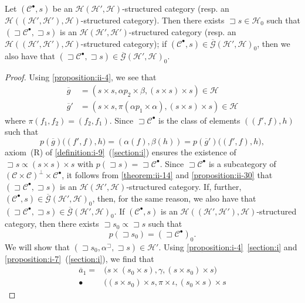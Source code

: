 \documentclass[a4paper,fleqn]{article}
\theoremstyle{plain}
\newenvironment{theorem}[1]
  {\renewcommand\theinnertheorem{#1}\innertheorem}
  {\endinnertheorem}
\theoremstyle{definition}
\newcommand{\oldpage}[1]{{\marginpar{\footnotesize$\bigg\vert$\,\,\,\,\textit{p.~#1}}}}
\newcommand{\CC}{\mathcal{C}}
\newcommand{\HH}{\mathcal{H}}
\newcommand{\subs}{\mathrel{\propto}}
\newcommand{\GG}{\mathcal{G}}
\DeclareMathOperator{\trio}{\sqsupset}
\newcommand{\smallbullet}{\bullet}
\begin{document}
\begin{theorem}{17}
\label{theorem:ii-17}
  Let $(\CC^\smallbullet,s)$ be an $\HH(\HH',\HH)$-structured category (resp. an $\HH((\HH',\HH'),\HH)$-structured category).
  Then there exists $\trio s\in\HH_0$ such that $(\trio\CC^\smallbullet,\trio s)$ is an $\HH(\HH',\HH')$-structured category (resp. an $\HH((\HH',\HH'),\HH)$-structured category);
  if $(\CC^\smallbullet,s)\in\overline{\GG}(\HH',\HH)_0$, then we also have that $(\trio\CC^\smallbullet,\trio s)\in\overline{\GG}(\HH',\HH)_0$.
\end{theorem}

\begin{proof}
  Using \cref{proposition:ii-4}, we see that
  \[
    \begin{aligned}
      \overline{g}
      &= (s\times s,\alpha p_2\times\beta, (s\times s)\times s)
      \in\HH
    \\\overline{g}'
      &= (s\times s,\pi(\alpha p_1\times\alpha), (s\times s)\times s)
      \in\HH
    \end{aligned}
  \]
  where $\pi(f_1,f_2)=(f_2,f_1)$.
  Since $\trio\CC^\smallbullet$ is the class of elements $((f',f),h)$ such that
  \[
    p(\overline{g})\big((f',f),h\big)
    = (\alpha(f),\beta(h))
    = p(\overline{g}')\big((f',f),h\big),
  \]
  \oldpage{424}
  axiom~(R) of \cref{definition:i-9}~(\cref{section:i}) ensures the existence of $\trio s\subs(s\times s)\times s$ with $p(\trio s)=\trio\CC^\smallbullet$.
  Since $\trio\CC^\smallbullet$ is a subcategory of $(\CC\times\CC)^\perp\times\CC^\smallbullet$, it follows from \cref{theorem:ii-14} and \cref{proposition:ii-30} that $(\trio\CC^\smallbullet,\trio s)$ is an $\HH(\HH',\HH)$-structured category.
  If, further, $(\CC^\smallbullet,s)\in\overline{\GG}(\HH',\HH)_0$, then, for the same reason, we also have that $(\trio\CC^\smallbullet,\trio s)\in\overline{\GG}(\HH',\HH)_0$.
  If $(\CC^\smallbullet,s)$ is an $\HH((\HH',\HH'),\HH)$-structured category, then there exists $\trio s_0\subs\trio s$ such that
  \[
    p(\trio s_0)
    = (\trio\CC^\smallbullet)_0.
  \]
  We will show that $(\trio s_0,\alpha^{\trio},\trio s)\in\HH'$.
  Using \cref{proposition:i-4}~\cref{section:i} and \cref{proposition:i-7}~(\cref{section:i}), we find that
  \[
    \begin{aligned}
      \overline{a}_1
      = &\big(
        s\times(s_0\times s),
        \gamma,
        (s\times s_0)\times s
      \big)
    \\\smallbullet
      &\big(
        (s\times s_0)\times s,
        \pi\times\iota,
        (s_0\times s)\times s

\end{aligned}\]
\end{proof}
\end{document}
